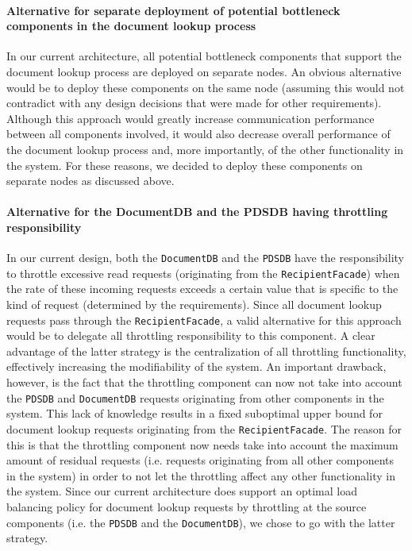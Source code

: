 \documentclass[a4paper,10pt]{article}
\begin{document}
\paragraph{Alternative for separate deployment of potential bottleneck components in the document lookup process}
In our current architecture, all potential bottleneck components that support the document lookup process are deployed on separate nodes. An obvious alternative would be to deploy these components on the same node (assuming this would not contradict with any design decisions that were made for other requirements). Although this approach would greatly increase communication performance between all components involved, it would also decrease overall performance of the document lookup process and, more importantly, of the other functionality in the system. For these reasons, we decided to deploy these components on separate nodes as discussed above.
\paragraph{Alternative for the DocumentDB and the PDSDB having throttling responsibility}
In our current design, both the \texttt{DocumentDB} and the \texttt{PDSDB} have the responsibility to throttle excessive read requests (originating from the \texttt{RecipientFacade}) when the rate of these incoming requests exceeds a certain value that is specific to the kind of request (determined by the requirements). Since all document lookup requests pass through the \texttt{RecipientFacade}, a valid alternative for this approach would be to delegate all throttling responsibility to this component. A clear advantage of the latter strategy is the centralization of all throttling functionality, effectively increasing the modifiability of the system. An important drawback, however, is the fact that the throttling component can now not take into account the \texttt{PDSDB} and \texttt{DocumentDB} requests originating from other components in the system. This lack of knowledge results in a fixed suboptimal upper bound for document lookup requests originating from the \texttt{RecipientFacade}. The reason for this is that the throttling component now needs take into account the maximum amount of residual requests (i.e. requests originating from all other components in the system) in order to not let the throttling affect any other functionality in the system. Since our current architecture does support an optimal load balancing policy for document lookup requests by throttling at the source components (i.e. the \texttt{PDSDB} and the \texttt{DocumentDB}), we chose to go with the latter strategy.
\end{document}
